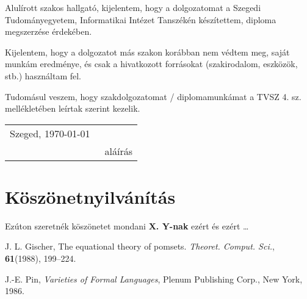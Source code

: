 \documentclass[12pt]{report}
\theoremstyle{definition}
\begin{document}

\noindent
Alulírott \makebox[4cm]{\dotfill} szakos hallgató, kijelentem, hogy a dolgozatomat a Szegedi Tudományegyetem, Informatikai Intézet \makebox[4cm]{\dotfill} Tanszékén készítettem, \makebox[4cm]{\dotfill} diploma megszerzése érdekében.

Kijelentem, hogy a dolgozatot más szakon korábban nem védtem meg, saját munkám eredménye, és csak a hivatkozott forrásokat (szakirodalom, eszközök, stb.) használtam fel.

Tudomásul veszem, hogy szakdolgozatomat / diplomamunkámat a TVSZ 4. sz. mellékletében leírtak szerint kezelik.

\vspace*{2cm}

\begin{tabular}{lc}
	Szeged, \today\
	\hspace{2cm} & \makebox[6cm]{\dotfill} \\
	             & aláírás                 \\
\end{tabular}





\chapter*{Köszönetnyilvánítás}

Ezúton szeretnék köszönetet mondani \textbf{X. Y-nak} ezért és ezért \ldots


%
%


\begin{thebibliography}{9}





	\bibitem{Gischer}
	J. L. Gischer,
	The equational theory of pomsets.
	\emph{Theoret. Comput. Sci.}, \textbf{61}(1988), 199--224.

	\bibitem{Pin}
	J.-E. Pin,
	\emph{Varieties of Formal Languages},
	Plenum Publishing Corp., New York, 1986.





\end{thebibliography}
\end{document}

